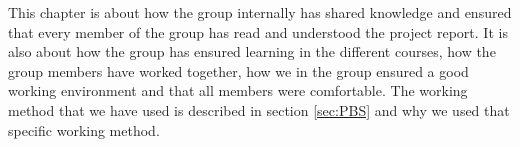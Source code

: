 This chapter is about how the group internally has shared knowledge and ensured that every member of the group has read and understood the project report. It is also about how the group has ensured learning in the different courses, how the group members have worked together, how we in the group ensured a good working environment and that all members were comfortable. The working method that we have used is described in section \ref{sec:PBS} and why we used that specific working method.